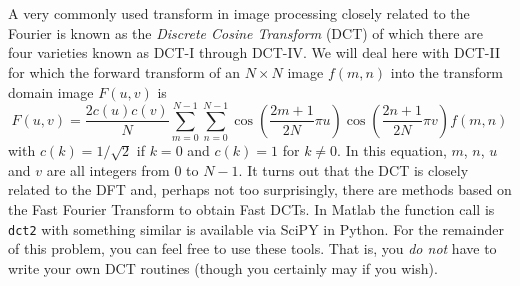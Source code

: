 \documentclass[11pt]{article}
\newcommand{\redtt}[1]{{\color{red} \texttt{#1}}}
\begin{document}
\section{}\label{ps04p03}
A very commonly used transform in image processing closely related to the Fourier is known as the \textit{Discrete Cosine Transform} (DCT) of which there are four varieties known as DCT-I through DCT-IV.  We will deal here with DCT-II for which the forward transform of an $N \times N$ image $f(m,n)$ into the transform domain image $F(u,v)$ is
\begin{equation}
	\label{eq:6p0}
	F(u,v)  = \frac{2c(u)c(v)}{N} 
	\sum_{m=0}^{N-1}\sum_{n=0}^{N-1} 
	\cos\left(\frac{2m+1}{2N}\pi u\right)
	\cos\left(\frac{2n+1}{2N}\pi v\right) f(m,n)
\end{equation}
with $c(k) = 1/\sqrt{2}$ if $k=0$ and $c(k) = 1$ for $k \neq 0$.  In this equation, $m$, $n$, $u$ and $v$ are all integers from $0$ to $N-1$.  It turns out that the DCT is closely related to the DFT and, perhaps not too surprisingly, there are methods based on the Fast Fourier Transform to obtain Fast DCTs.  In Matlab the function call is \redtt{dct2} with something similar is available via SciPY in Python.  For the remainder of this problem, you can feel free to use these tools.  That is, you \textit{do not} have to write your own DCT routines (though you certainly may if you wish).  
\end{document}
